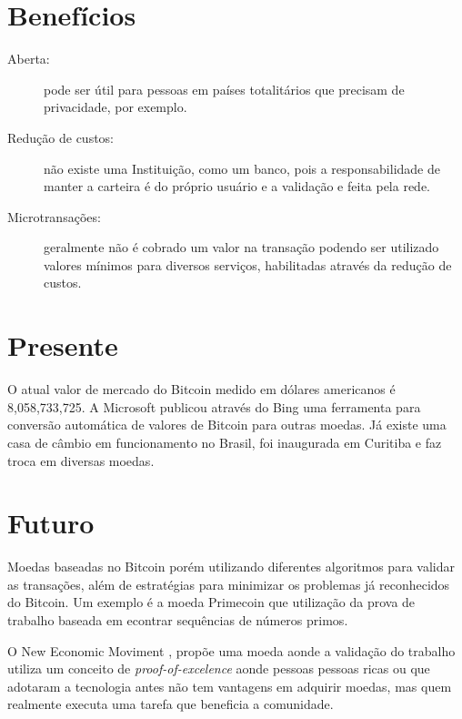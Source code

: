 \documentclass[a4paper,11pt]{article}
\theoremstyle{mytheor}
\begin{document}
\section*{Benefícios}
\begin{description}
\item[Aberta:] pode ser útil para pessoas em países totalitários que precisam de privacidade, por exemplo. 
\item[Redução de custos:] não existe uma Instituição, como um banco, pois a responsabilidade de manter a carteira é do próprio usuário e a validação e feita pela rede.
\item[Microtransações:] geralmente não é cobrado um valor na transação podendo ser utilizado valores mínimos para diversos serviços, habilitadas através da redução de custos.
\end{description}

\section*{Presente}
O atual valor de mercado do Bitcoin medido em dólares americanos é 8,058,733,725.
A Microsoft publicou \cite{bing} através do Bing uma ferramenta para conversão automática de valores de Bitcoin para outras moedas. Já existe uma casa de câmbio em funcionamento no Brasil, foi inaugurada em Curitiba e faz troca em diversas moedas. 

\section*{Futuro}

Moedas baseadas no Bitcoin porém utilizando diferentes algoritmos para validar as transações, além de estratégias para minimizar os problemas já reconhecidos do Bitcoin. Um exemplo é a moeda Primecoin que utilização da prova de trabalho baseada em econtrar sequências de números primos.

O New Economic Moviment \cite{nem}, propõe uma moeda aonde a validação do trabalho utiliza um conceito de \textit{proof-of-excelence} aonde pessoas pessoas ricas ou que adotaram a tecnologia antes não tem vantagens em adquirir moedas, mas quem realmente executa uma tarefa que beneficia a comunidade.


{}

\end{document}
